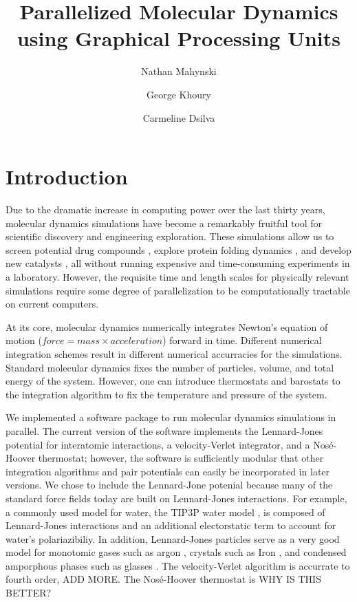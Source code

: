 \documentclass[12pt]{article}
\title{Parallelized Molecular Dynamics using Graphical Processing Units}
\author{Nathan Mahynski \and George Khoury \and Carmeline Dsilva}
\begin{document}
\maketitle

\section{Introduction}

Due to the dramatic increase in computing power over the last thirty years, molecular dynamics simulations have become a remarkably fruitful tool for scientific discovery and engineering exploration.
%
These simulations allow us to screen potential drug compounds \cite{...}, explore protein folding dynamics \cite{...}, and develop new catalysts \cite{...}, all without running expensive and time-consuming experiments in a laboratory.
%
However, the requisite time and length scales for physically relevant simulations require some degree of parallelization to be computationally tractable on current computers.

At its core, molecular dynamics numerically integrates Newton's equation of motion ($force = mass \times acceleration$) forward in time.
%
Different numerical integration schemes result in different numerical accurracies for the simulations.
%
Standard molecular dynamics fixes the number of particles, volume, and total energy of the system.
%
However, one can introduce thermostats and barostats to the integration algorithm to fix the temperature and pressure of the system.

We implemented a software package to run molecular dynamics simulations in parallel.
%
The current version of the software implements the Lennard-Jones potential for interatomic interactions, a velocity-Verlet integrator, and a Nos\'{e}-Hoover thermostat; however, the software is sufficiently modular that other integration algorithms and pair potentials can easily be incorporated in later versions.
%
We chose to include the Lennard-Jone potenial because many of the standard force fields today are built on Lennard-Jones interactions.
%
For example, a commonly used model for water, the TIP3P water model \cite{jorgensen1983comparison}, is composed of Lennard-Jones interactions and an additional electorstatic term to account for water's polariazibiliy.
%
In addition, Lennard-Jones particles serve as a very good model for monotomic gases such as argon \cite{...}, crystals such as Iron \cite{...}, and condensed amporphous phases such as glasses \cite{...}.
%
The velocity-Verlet algorithm \cite{...} is accurrate to fourth order, ADD MORE.
%
The Nos\'{e}-Hoover thermostat is WHY IS THIS BETTER?
\end{document}
